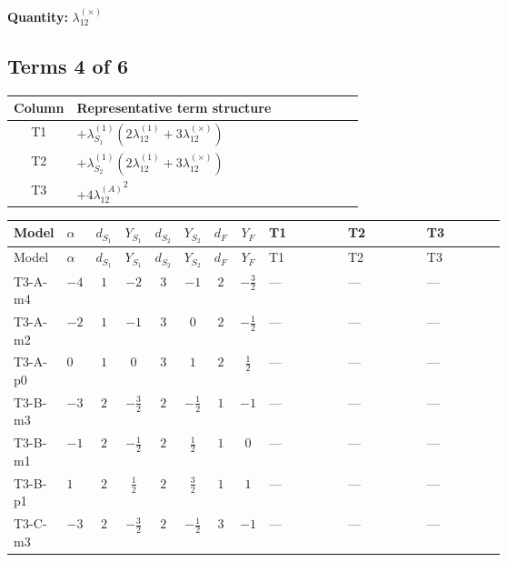 \documentclass[8pt]{article}
\begin{document}
\begin{landscape}
\begin{longtable}{@{}llcccccc >{\raggedright\arraybackslash}p{0.21\linewidth} >{\raggedright\arraybackslash}p{0.21\linewidth} >{\raggedright\arraybackslash}p{0.21\linewidth}@{}}
\midrule
\bottomrule
\end{longtable}
\clearpage
\noindent\textbf{Quantity: }$\lambda_{12}^{(\times)}$\par\smallskip
\subsection*{Terms 4 of 6}
\begin{center}
\begin{tabular}{@{}c >{\raggedright\arraybackslash}p{0.82\linewidth}@{}}
\toprule
Column & Representative term structure \\
\midrule
T1 & \(\displaystyle +{\lambda_{S_1}^{(1)}} (2 {\lambda_{12}^{(1)}}+3 {\lambda_{12}^{(\times)}})\) \\
\midrule
T2 & \(\displaystyle +{\lambda_{S_2}^{(1)}} (2 {\lambda_{12}^{(1)}}+3 {\lambda_{12}^{(\times)}})\) \\
\midrule
T3 & \(\displaystyle +4 {\lambda_{12}^{(A)}}^2\) \\
\midrule
\bottomrule
\end{tabular}
\end{center}
\smallskip
\tiny
\begin{longtable}{@{}llcccccc >{\raggedright\arraybackslash}p{0.21\linewidth} >{\raggedright\arraybackslash}p{0.21\linewidth} >{\raggedright\arraybackslash}p{0.21\linewidth}@{}}
\toprule
Model & $\alpha$ & $d_{S_1}$ & $Y_{S_1}$ & $d_{S_2}$ & $Y_{S_2}$ & $d_F$ & $Y_F$ & T1 & T2 & T3 \\
\midrule
\endfirsthead
\toprule
Model & $\alpha$ & $d_{S_1}$ & $Y_{S_1}$ & $d_{S_2}$ & $Y_{S_2}$ & $d_F$ & $Y_F$ & T1 & T2 & T3 \\
\midrule
\endhead
T3-A-m4 & $-4$ & $1$ & $-2$ & $3$ & $-1$ & $2$ & $-\frac{3}{2}$ & --- & --- & --- \\
\midrule
T3-A-m2 & $-2$ & $1$ & $-1$ & $3$ & $0$ & $2$ & $-\frac{1}{2}$ & --- & --- & --- \\
\midrule
T3-A-p0 & $0$ & $1$ & $0$ & $3$ & $1$ & $2$ & $\frac{1}{2}$ & --- & --- & --- \\
\midrule
T3-B-m3 & $-3$ & $2$ & $-\frac{3}{2}$ & $2$ & $-\frac{1}{2}$ & $1$ & $-1$ & --- & --- & --- \\
\midrule
T3-B-m1 & $-1$ & $2$ & $-\frac{1}{2}$ & $2$ & $\frac{1}{2}$ & $1$ & $0$ & --- & --- & --- \\
\midrule
T3-B-p1 & $1$ & $2$ & $\frac{1}{2}$ & $2$ & $\frac{3}{2}$ & $1$ & $1$ & --- & --- & --- \\
\midrule
T3-C-m3 & $-3$ & $2$ & $-\frac{3}{2}$ & $2$ & $-\frac{1}{2}$ & $3$ & $-1$ & --- & --- & --- \\

\end{longtable}
\end{landscape}
\end{document}
